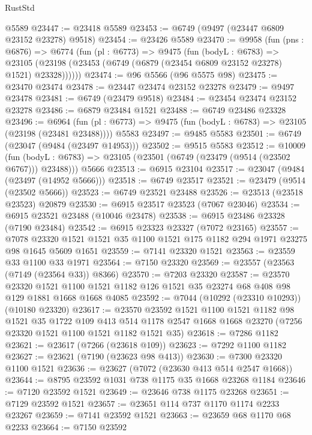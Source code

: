 \begin{lexlean}{RustStd}
\begin{coremodule}
    @5589
@23447 := @23418 @5589
@23453 := @6749 (@9497 (@23447 @6809 @23152 @23278) @9518)
@23454 := @23426 @5589
@23470 := @9958
    (fun (pns : @6876) =>
    @6774
      (fun (pl : @6773) =>
      @9475
        (fun (bodyL : @6783) =>
        @23105 (@23198 (@23453 (@6749 (@6879 (@23454 @6809 @23152 @23278) @1521) @23328))))))
@23474 := @96 @5566 (@96 @5575 @98)
@23475 := @23470 @23474
@23478 := @23447 @23474 @23152 @23278
@23479 := @9497 @23478
@23481 := @6749 (@23479 @9518)
@23484 := @23454 @23474 @23152 @23278
@23486 := @6879 @23484 @1521
@23488 := @6749 @23486 @23328
@23496 := @6964
    (fun (pl : @6773) => @9475 (fun (bodyL : @6783) => @23105 (@23198 (@23481 @23488))))
    @5583
@23497 := @9485 @5583
@23501 := @6749 (@23047 (@9484 (@23497 @14953)))
@23502 := @9515 @5583
@23512 := @10009
    (fun (bodyL : @6783) => @23105 (@23501 (@6749 (@23479 (@9514 (@23502 @6767))) @23488)))
    @5666
@23513 := @6915 @23104
@23517 := @23047 (@9484 (@23497 (@14952 @5666)))
@23518 := @6749 @23517
@23521 := @23479 (@9514 (@23502 @5666))
@23523 := @6749 @23521 @23488
@23526 := @23513 (@23518 @23523) @20879
@23530 := @6915 @23517 @23523 (@7067 @23046)
@23534 := @6915 @23521 @23488 (@10046 @23478)
@23538 := @6915 @23486 @23328 (@7190 @23484)
@23542 := @6915 @23323 @23327 (@7072 @23165)
@23557 := @7078
    @23320
    @1521
    @1521
    @35
    @1100
    @1521
    @175
    @1182
    @294
    @1971
    @23275
    @98
    @1645
    @5609
    @1651
@23559 := @7141 @23320 @1521
@23563 := @23559 @33 @1100 @33 @1971
@23564 := @7150 @23320
@23569 := @23557 (@23563 (@7149 (@23564 @33)) @8366)
@23570 := @7203 @23320
@23587 := @23570
    @23320
    @1521
    @1100
    @1521
    @1182
    @126
    @1521
    @35
    @23274
    @68
    @408
    @98
    @129
    @1881
    @1668
    @1668
    @4085
@23592 := @7044 (@10292 (@23310 @10293)) (@10180 @23320)
@23617 := @23570
    @23592
    @1521
    @1100
    @1521
    @1182
    @98
    @1521
    @35
    @1722
    @109
    @413
    @514
    @1178
    @2547
    @1668
    @1668
    @23270
    (@7256 @23320 @1521 @1100 @1521 @1182 @1521 @35)
@23618 := @7286 @1182
@23621 := @23617 (@7266 (@23618 @109))
@23623 := @7292 @1100 @1182
@23627 := @23621 (@7190 (@23623 @98 @413))
@23630 := @7300 @23320 @1100 @1521
@23636 := @23627 (@7072 (@23630 @413 @514 @2547 @1668))
@23644 := @8795 @23592 @1031 @738 @1175 @35 @1668 @23268 @1184
@23646 := @7120 @23592 @1521
@23649 := @23646 @738 @1175 @23268
@23651 := @7129 @23592 @1521
@23657 := @23651 @114 @737 @1170 @1174 @2233 @23267
@23659 := @7141 @23592 @1521
@23663 := @23659 @68 @1170 @68 @2233
@23664 := @7150 @23592

\end{coremodule}
\end{lexlean}
